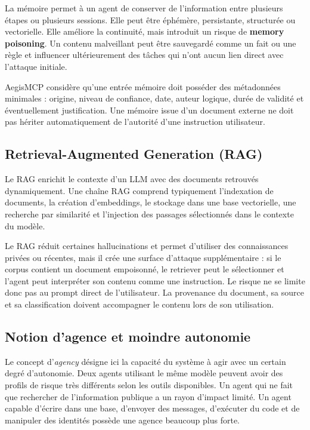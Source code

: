 La mémoire permet à un agent de conserver de l'information entre plusieurs étapes ou plusieurs sessions. Elle peut être éphémère, persistante, structurée ou vectorielle. Elle améliore la continuité, mais introduit un risque de \textbf{memory poisoning}. Un contenu malveillant peut être sauvegardé comme un fait ou une règle et influencer ultérieurement des tâches qui n'ont aucun lien direct avec l'attaque initiale.

AegisMCP considère qu'une entrée mémoire doit posséder des métadonnées minimales : origine, niveau de confiance, date, auteur logique, durée de validité et éventuellement justification. Une mémoire issue d'un document externe ne doit pas hériter automatiquement de l'autorité d'une instruction utilisateur.

\subsection{Retrieval-Augmented Generation (RAG)}

Le RAG enrichit le contexte d'un LLM avec des documents retrouvés dynamiquement. Une chaîne RAG comprend typiquement l'indexation de documents, la création d'embeddings, le stockage dans une base vectorielle, une recherche par similarité et l'injection des passages sélectionnés dans le contexte du modèle.

Le RAG réduit certaines hallucinations et permet d'utiliser des connaissances privées ou récentes, mais il crée une surface d'attaque supplémentaire : si le corpus contient un document empoisonné, le retriever peut le sélectionner et l'agent peut interpréter son contenu comme une instruction. Le risque ne se limite donc pas au prompt direct de l'utilisateur. La provenance du document, sa source et sa classification doivent accompagner le contenu lors de son utilisation.

\subsection{Notion d'agence et moindre autonomie}

Le concept d'\emph{agency} désigne ici la capacité du système à agir avec un certain degré d'autonomie. Deux agents utilisant le même modèle peuvent avoir des profils de risque très différents selon les outils disponibles. Un agent qui ne fait que rechercher de l'information publique a un rayon d'impact limité. Un agent capable d'écrire dans une base, d'envoyer des messages, d'exécuter du code et de manipuler des identités possède une agence beaucoup plus forte.

